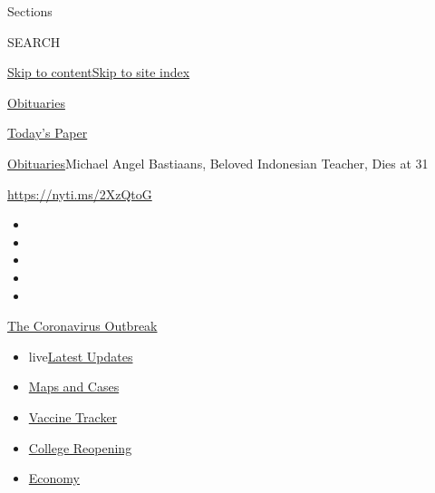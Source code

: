 Sections

SEARCH

\protect\hyperlink{site-content}{Skip to
content}\protect\hyperlink{site-index}{Skip to site index}

\href{https://www.nytimes.com/section/obituaries}{Obituaries}

\href{https://myaccount.nytimes.com/auth/login?response_type=cookie\&client_id=vi}{}

\href{https://www.nytimes.com/section/todayspaper}{Today's Paper}

\href{/section/obituaries}{Obituaries}\textbar{}Michael Angel Bastiaans,
Beloved Indonesian Teacher, Dies at 31

\url{https://nyti.ms/2XzQtoG}

\begin{itemize}
\item
\item
\item
\item
\item
\end{itemize}

\href{https://www.nytimes.com/news-event/coronavirus?action=click\&pgtype=Article\&state=default\&region=TOP_BANNER\&context=storylines_menu}{The
Coronavirus Outbreak}

\begin{itemize}
\tightlist
\item
  live\href{https://www.nytimes.com/2020/08/03/world/coronavirus-covid-19.html?action=click\&pgtype=Article\&state=default\&region=TOP_BANNER\&context=storylines_menu}{Latest
  Updates}
\item
  \href{https://www.nytimes.com/interactive/2020/us/coronavirus-us-cases.html?action=click\&pgtype=Article\&state=default\&region=TOP_BANNER\&context=storylines_menu}{Maps
  and Cases}
\item
  \href{https://www.nytimes.com/interactive/2020/science/coronavirus-vaccine-tracker.html?action=click\&pgtype=Article\&state=default\&region=TOP_BANNER\&context=storylines_menu}{Vaccine
  Tracker}
\item
  \href{https://www.nytimes.com/2020/08/02/us/covid-college-reopening.html?action=click\&pgtype=Article\&state=default\&region=TOP_BANNER\&context=storylines_menu}{College
  Reopening}
\item
  \href{https://www.nytimes.com/live/2020/08/03/business/stock-market-today-coronavirus?action=click\&pgtype=Article\&state=default\&region=TOP_BANNER\&context=storylines_menu}{Economy}
\end{itemize}

